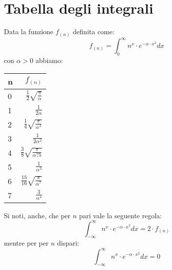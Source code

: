 \chapter{Tabella degli integrali}
Data la funzione $f_{(n)}$ definita come:
\begin{equation}
	f_{(n)} = \int_0^{\infty} n^x \cdot e^{-\alpha \cdot x^2} d x
	\label{eq:AppA:IntegraleGenerico}
\end{equation}
con $\alpha > 0$ abbiamo:
\begin{table*}[h]
	\centering
		\begin{tabular}{lr}
			n		&		$f_{(n)}$ \\ \hline
			0		&		$\frac{1}{2} \sqrt{\frac{\pi}{\alpha}} $  			\vspace{0.2cm} \\ \hline
			1		&		$\frac{1}{2 \alpha}$ 														\vspace{0.2cm} \\ \hline
			2		&		$\frac{1}{4} \sqrt{\frac{\pi}{\alpha^3}} $ 			\vspace{0.2cm} \\ \hline
			3		&		$\frac{1}{2 \alpha^2}$ 													\vspace{0.2cm} \\ \hline
			4		&		$\frac{3}{8} \sqrt{\frac{\pi}{\alpha?5}} $ 			\vspace{0.2cm} \\ \hline
			5		&		$\frac{1}{\alpha^3}$ 														\vspace{0.2cm} \\ \hline
			6		&		$\frac{15}{16} \sqrt{\frac{\pi}{\alpha^7}} $ 		\vspace{0.2cm} \\ \hline
			7		&		$\frac{3}{\alpha^4}$ 														\vspace{0.2cm} \\ \hline
		\end{tabular}
\end{table*}

Si noti, anche, che per $n$ pari vale la seguente regola:
\begin{equation}
	\int_{-\infty}^{\infty} n^x \cdot e^{-\alpha \cdot x^2} d x = 2 \cdot f_{(n)}
	\label{eq:AppA:IntegraleGenericoPari}
\end{equation}
mentre per per $n$ dispari:
\begin{equation}
	\int_{-\infty}^{\infty} n^x \cdot e^{-\alpha \cdot x^2} d x = 0
	\label{eq:AppA:IntegraleGenericoDispari}
\end{equation}